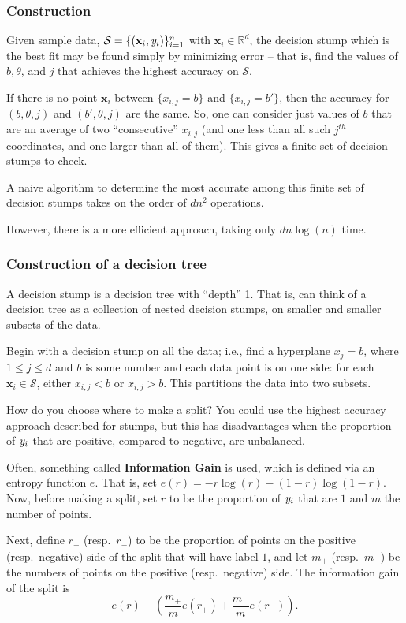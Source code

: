 \documentclass[smaller]{beamer}
\theoremstyle{example}
\newcommand{\x}{\textbf{x}}
\newcommand{\ix}[1]{{\it #1}}
\begin{document}
\begin{frame}
    \frametitle{Construction}
Given sample data, $\mathcal S = \{(\x_i, \ix y_i)\}_{i=1}^n$ with $\x_i\in\mathbb R^d$, the decision stump which is the best fit may be found simply by minimizing error {--} that is, find the values of $b, \theta$, and $j$ that achieves the highest accuracy on $\mathcal S$. 

If there is no point $\x_i$ between $\{x_{i,j} = b\}$ and $\{x_{i,j} = b'\}$, then the accuracy for $(b,\theta,j)$ and $(b',\theta,j)$ are the same. So, one can consider just values of $b$ that are an average of two ``consecutive'' $x_{i,j}$ (and one less than all such $j^{th}$ coordinates, and one larger than all of them). This gives a finite set of decision stumps to check.

A naive algorithm to determine the most accurate among this finite set of decision stumps takes on the order of $dn^2$ operations. 

However, there is a more efficient approach, taking only $dn\log(n)$ time.
\end{frame}

\begin{frame}
    \frametitle{Construction of a decision tree}
A decision stump is a decision tree with ``depth'' 1. That is, can think of a decision tree as a collection of nested decision stumps, on smaller and smaller subsets of the data.

Begin with a decision stump on all the data; i.e., find a hyperplane $ x_j = b$, where $ 1\le j\le d$ and $b$ is some number and each data point is on one side: for each $\x_i \in \mathcal S$, either $x_{i,j} < b$ or $ x_{i,j} > b$. This partitions the data into two subsets.

How do you choose where to make a split? You could use the highest accuracy approach described for stumps, but this has disadvantages when the proportion of $\ix y_i$ that are positive, compared to negative, are unbalanced.

Often, something called \textbf{Information Gain} is used, which is defined via an entropy function $e$. That is, set $e(r) = -r\log(r) - (1-r)\log(1-r)$. Now, before making a split, set $r$ to be the proportion of $\ix y_i$ that are $1$ and $m$ the number of points. 

Next, define $r_+$ (resp.\ $r_-$) to be the proportion of points on the positive (resp.\ negative) side of the split that will have label $1$, and let $m_+$ (resp.\ $m_-$) be the numbers of points on the positive (resp.\ negative) side. The information gain of the split is 
    \[e(r) - (\frac{m_+}{m}e(r_+) + \frac{m_-}{m}e(r_-)).\]

\end{frame}
\end{document}
